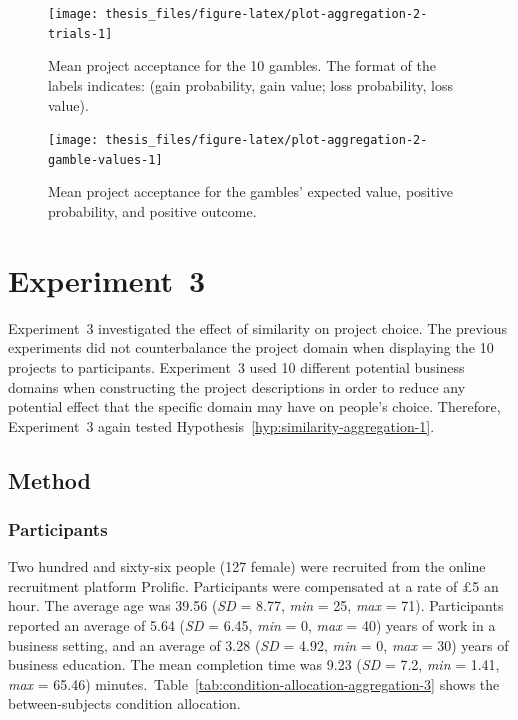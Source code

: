 \documentclass[a4paper, nobind, dvipsnames]{templates/ociamthesis}
\theoremstyle{definition}
\theoremstyle{definition}
\theoremstyle{definition}
\theoremstyle{definition}
\theoremstyle{remark}
\begin{document}
\begin{figure}
\texttt{[image: thesis\_files/figure-latex/plot-aggregation-2-trials-1]} \caption{Mean project acceptance for the 10 gambles. The format of the labels indicates: (gain probability, gain value; loss probability, loss value).}\label{fig:plot-aggregation-2-trials}
\end{figure}



\begin{figure}
\texttt{[image: thesis\_files/figure-latex/plot-aggregation-2-gamble-values-1]} \caption{Mean project acceptance for the gambles' expected value, positive probability, and positive outcome.}\label{fig:plot-aggregation-2-gamble-values}
\end{figure}

\hypertarget{aggregation-3}{%
\section{Experiment~3}\label{aggregation-3}}

Experiment~3 investigated the effect of similarity on project choice. The
previous experiments did not counterbalance the project domain when displaying
the 10 projects to participants. Experiment~3 used 10 different potential
business domains when constructing the project descriptions in order to reduce
any potential effect that the specific domain may have on people's choice.
Therefore, Experiment~3 again tested
Hypothesis~\ref{hyp:similarity-aggregation-1}.

\subsection{Method}

\subsubsection{Participants}

Two hundred and sixty-six people (127 female) were recruited from the online recruitment platform Prolific. Participants were compensated at a rate of £5 an hour. The average age was 39.56 (\emph{SD} = 8.77, \emph{min} = 25, \emph{max} = 71). Participants reported an average of 5.64 (\emph{SD} = 6.45, \emph{min} = 0, \emph{max} = 40) years of work in a business setting, and an average of 3.28 (\emph{SD} = 4.92, \emph{min} = 0, \emph{max} = 30) years of business education. The mean completion time was 9.23 (\emph{SD} = 7.2, \emph{min} = 1.41, \emph{max} = 65.46) minutes.~Table~\ref{tab:condition-allocation-aggregation-3}
shows the between-subjects condition allocation.
\end{document}
